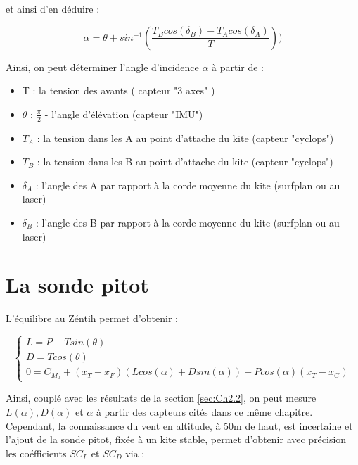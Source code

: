 et ainsi d'en déduire :

\begin{center}
    \begin{equation}
        \alpha = \theta + sin^{-1}(\frac{T_B cos(\delta_B) - T_A cos(\delta_A)}{T}))
        \label{eq:alpha}
    \end{equation}
\end{center}

Ainsi, on peut déterminer l'angle d'incidence $\alpha$ à partir de :
\begin{itemize}
    \item T : la tension des avants ( capteur "3 axes" )
    \item $\theta$ : $\frac{\pi}{2}$ - l'angle d'élévation (capteur "IMU")
    \item $T_A$ : la tension dans les A au point d'attache du kite (capteur "cyclops")
    \item $T_B$ : la tension dans les B au point d'attache du kite (capteur "cyclops")
    \item $\delta_A$ : l'angle des A par rapport à la corde moyenne du kite (surfplan ou au laser)
    \item $\delta_B$ : l'angle des B par rapport à la corde moyenne du kite (surfplan ou au laser)
\end{itemize}

\section{La sonde pitot} 
\label{sec:Ch2.3}

L'équilibre au Zéntih permet d'obtenir : 

\begin{equation}
    \begin{cases}
        L = P + T sin(\theta) \\
        D = T cos(\theta) \\
        0 = C_{M_0} + (x_T - x_F) (L cos(\alpha) + D sin(\alpha)) - P cos(\alpha) (x_T - x_G)
    \end{cases}
    \label{eq:equilibre aero}
\end{equation}


Ainsi, couplé avec les résultats de la section \ref{sec:Ch2.2}, on peut mesure $L(\alpha), D(\alpha)$ et $\alpha$ à partir des capteurs cités dans ce même chapitre. 
Cependant, la connaissance du vent en altitude, à 50m de haut, est incertaine et l'ajout de la sonde pitot, fixée à un kite stable, permet d'obtenir avec précision les coéfficients $SC_L$ et $SC_D$ via :

